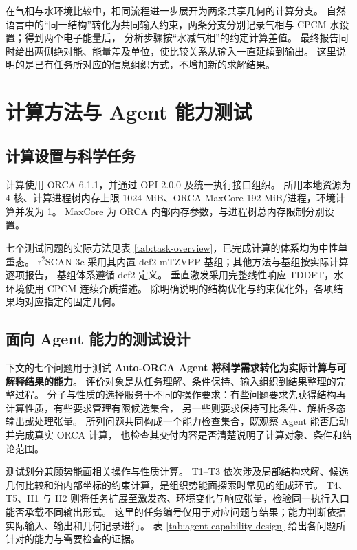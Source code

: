 \documentclass[UTF8,fontset=fandol,a4paper,11pt]{ctexart}
\begin{document}
在气相与水环境比较中，相同流程进一步展开为两条共享几何的计算分支。%
自然语言中的“同一结构”转化为共同输入约束，两条分支分别记录气相与 CPCM 水设置；得到两个电子能量后，%
分析步骤按“水减气相”的约定计算差值。%
最终报告同时给出两侧绝对能、能量差及单位，使比较关系从输入一直延续到输出。%
这里说明的是已有任务所对应的信息组织方式，不增加新的求解结果。


\section{计算方法与 Agent 能力测试}
\subsection{计算设置与科学任务}
计算使用 ORCA 6.1.1，并通过 OPI 2.0.0 及统一执行接口组织。%
所用本地资源为 4 核、计算进程树内存上限 1024 MiB、ORCA MaxCore 192 MiB/进程，环境计算并发为 1。%
MaxCore 为 ORCA 内部内存参数，与进程树总内存限制分别设置。

七个测试问题的实际方法见表 \ref{tab:task-overview}，已完成计算的体系均为中性单重态。%
r$^{2}$SCAN-3c 采用其内置 def2-mTZVPP 基组\cite{r2scan3c}；其他方法与基组按实际计算逐项报告，%
基组体系遵循 def2 定义\cite{def2}。%
垂直激发采用完整线性响应 TDDFT\cite{tddft}，水环境使用 CPCM 连续介质描述\cite{cpcm}。%
除明确说明的结构优化与约束优化外，各项结果均对应指定的固定几何。

\subsection{面向 Agent 能力的测试设计}
\label{sec:agent-evaluation-design}
下文的七个问题用于测试 \textbf{Auto-ORCA Agent 将科学需求转化为实际计算与可解释结果的能力}。%
评价对象是从任务理解、条件保持、输入组织到结果整理的完整过程。%
分子与性质的选择服务于不同的操作要求：有些问题要求先获得结构再计算性质，有些要求管理有限候选集合，%
另一些则要求保持可比条件、解析多态输出或处理张量。%
所列问题共同构成一个能力检查集合，既观察 Agent 能否启动并完成真实 ORCA 计算，%
也检查其交付内容是否清楚说明了计算对象、条件和结论范围。

测试划分兼顾势能面相关操作与性质计算。%
T1--T3 依次涉及局部结构求解、候选几何比较和沿内部坐标的约束计算，是组织势能面探索时常见的组成环节。%
T4、T5、H1 与 H2 则将任务扩展至激发态、环境变化与响应张量，检验同一执行入口能否承载不同输出形式。%
这里的任务编号仅用于对应问题与结果；能力判断依据实际输入、输出和几何记录进行。%
表 \ref{tab:agent-capability-design} 给出各问题所针对的能力与需要检查的证据。
\end{document}
